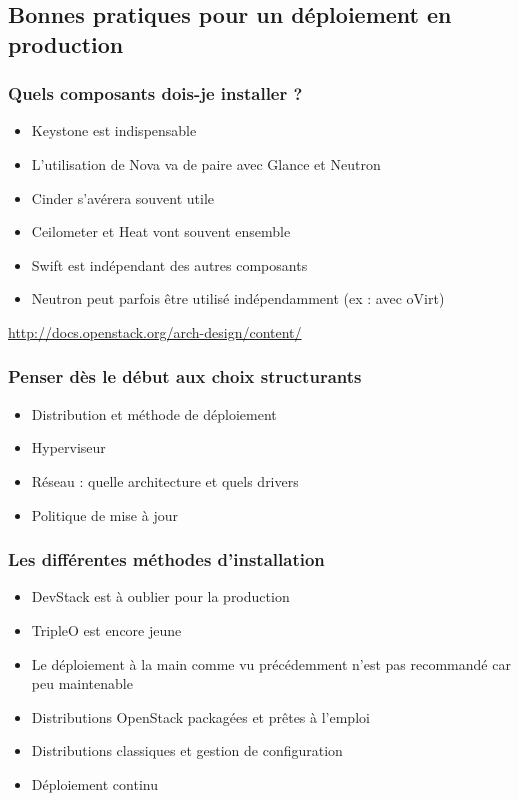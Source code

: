   \subsection[Déployer en production]{Bonnes pratiques pour un déploiement en production}

  \begin{frame}
    \frametitle{Quels composants dois-je installer ?}
    \begin{itemize}
      \item Keystone est indispensable
      \item L'utilisation de Nova va de paire avec Glance et Neutron
      \item Cinder s'avérera souvent utile
      \item Ceilometer et Heat vont souvent ensemble
      \item Swift est indépendant des autres composants
      \item Neutron peut parfois être utilisé indépendamment (ex : avec oVirt)
    \end{itemize}
    \url{http://docs.openstack.org/arch-design/content/}
  \end{frame}

  \begin{frame}
    \frametitle{Penser dès le début aux choix structurants}
    \begin{itemize}
      \item Distribution et méthode de déploiement
      \item Hyperviseur
      \item Réseau : quelle architecture et quels drivers
      \item Politique de mise à jour
    \end{itemize}
  \end{frame}

  \begin{frame}
    \frametitle{Les différentes méthodes d'installation}
    \begin{itemize}
      \item DevStack est à oublier pour la production
      \item TripleO est encore jeune
      \item Le déploiement à la main comme vu précédemment n'est pas recommandé car peu maintenable
      \item Distributions OpenStack packagées et prêtes à l'emploi
      \item Distributions classiques et gestion de configuration
      \item Déploiement continu
    \end{itemize}
  \end{frame}

